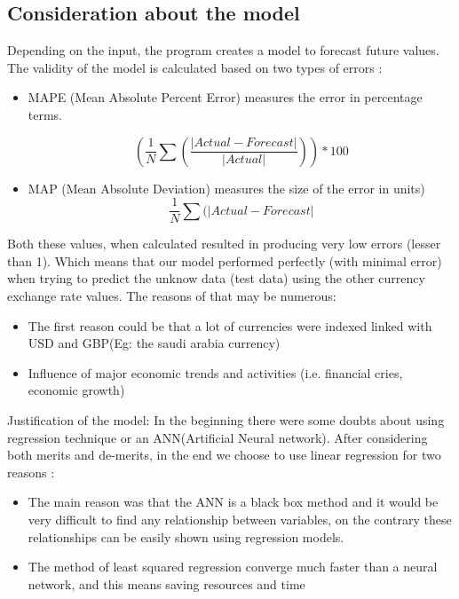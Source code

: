 \subsection{Consideration about the model}

Depending on the input, the program creates a model to forecast future values. The validity of the model is calculated based on two types of errors : 
\begin{itemize}
\item MAPE (Mean Absolute Percent Error) measures the error in percentage terms. 
\begin{center}
\[ (\frac{1}{N}\sum(\frac{|Actual-Forecast|}{|Actual|}))*100\]
\end{center}
\item MAP (Mean Absolute Deviation) measures the size of the error in units) 
\[ \frac{1}{N}\sum(|Actual-Forecast|\]
\end{itemize}
Both these values, when calculated resulted in producing very low errors (lesser than 1). Which means that our model performed perfectly (with minimal error) when trying to predict the unknow data (test data) using the other currency exchange rate values.
The reasons of that may be numerous:
\begin{itemize}
\item The first reason could be that a lot of currencies were indexed linked with USD and GBP(Eg: the saudi arabia currency) 
\item Influence of major economic trends and activities (i.e. financial cries, economic growth)

\end{itemize}


Justification of the model:
\newline
In the beginning there were some doubts about using regression technique or an ANN(Artificial Neural network)\cite{leung2000forecasting}.
After considering both merits and de-merits, in the end we choose to use linear regression for two reasons : 
\begin{itemize}
\item The main reason was that the ANN is a black box method and it would be very difficult to find any relationship between variables, on the contrary these relationships can be easily shown using regression models. 
\item The method of least squared regression converge much faster than a neural network, and this means saving resources and time 
\end{itemize}

